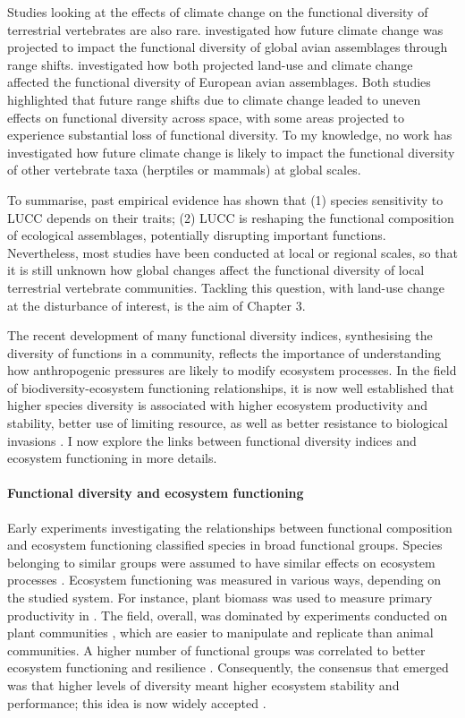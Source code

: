 Studies looking at the effects of climate change on the functional diversity of terrestrial vertebrates are also rare. \citet{BarbetMassin2015} investigated how future climate change was projected to impact the functional diversity of global avian assemblages through range shifts. \citet{Thuiller2014} investigated how both projected land-use and climate change affected the functional diversity of European avian assemblages. Both studies highlighted that future range shifts due to climate change leaded to uneven effects on functional diversity across space, with some areas projected to experience substantial loss of functional diversity. To my knowledge, no work has investigated how future climate change is likely to impact the functional diversity of other vertebrate taxa (herptiles or mammals) at global scales. 

To summarise, past empirical evidence has shown that (1) species sensitivity to LUCC depends on their traits; (2) LUCC  is reshaping the functional composition of ecological assemblages, potentially disrupting important functions. Nevertheless, most studies have been conducted at local or regional scales, so that it is still unknown how global changes affect the functional diversity of local terrestrial vertebrate communities. Tackling this question, with land-use change at the disturbance of interest, is the aim of Chapter 3. 

The recent development of many functional diversity indices, synthesising the diversity of functions in a community, reflects the importance of understanding how anthropogenic pressures are likely to modify ecosystem processes. In the field of biodiversity-ecosystem functioning relationships, it is now well established that higher species diversity is associated with higher ecosystem productivity and stability, better use of limiting resource, as well as better resistance to biological invasions \citep{Tilman2014}. I now explore the links between functional diversity indices and ecosystem functioning in more details.

\paragraph{Functional diversity and ecosystem functioning}

Early experiments investigating the relationships between functional composition and ecosystem functioning classified species in broad functional groups. Species belonging to similar groups were assumed to have similar effects on ecosystem processes \citep{Legras2018}. Ecosystem functioning was measured in various ways, depending on the studied system. For instance, plant biomass was used to measure primary productivity in \citet{Weisser2017}. The field, overall, was dominated by experiments conducted on plant communities \citep{Tilman2014}, which are easier to manipulate and replicate than animal communities. A higher number of functional groups was correlated to better ecosystem functioning and resilience \citep{Tilman1994, Hector1999}. Consequently, the consensus that emerged was that higher levels of diversity meant higher ecosystem stability and performance; this idea is now widely accepted \citep{Hooper2005, Hooper2012, Oliver2015}. 

